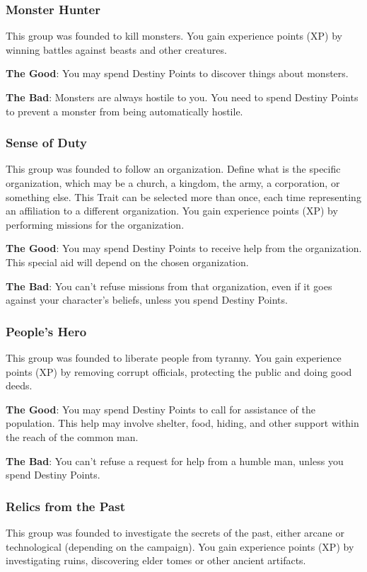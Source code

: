 \subsubsection{Monster Hunter}
This group was founded to kill monsters.
You gain experience points (XP) by winning battles
against beasts and other creatures.

\textbf{The Good}: You may spend Destiny Points
to discover things about monsters.

\textbf{The Bad}: Monsters are always hostile to
you. You need to spend Destiny Points to prevent a
monster from being automatically hostile.

\subsubsection{Sense of Duty}
This group was founded to follow an
organization. Define what is the specific
organization, which may be a church, a kingdom,
the army, a corporation, or something else. This
Trait can be selected more than once, each time
representing an affiliation to a different
organization. You gain experience points (XP) by
performing missions for the organization.

\textbf{The Good}: You may spend Destiny Points
to receive help from the organization. This special
aid will depend on the chosen organization.

\textbf{The Bad}: You can’t refuse missions from
that organization, even if it goes against your
character’s beliefs, unless you spend Destiny
Points.

\subsubsection{People’s Hero}
This group was founded to liberate people
from tyranny. You gain experience points (XP) by
removing corrupt officials, protecting the public
and doing good deeds.

\textbf{The Good}: You may spend Destiny Points
to call for assistance of the population. This help
may involve shelter, food, hiding, and other
support within the reach of the common man.

\textbf{The Bad}: You can’t refuse a request for
help from a humble man, unless you spend Destiny
Points.

\subsubsection{Relics from the Past}
This group was founded to investigate the
secrets of the past, either arcane or technological
(depending on the campaign). You gain experience
points (XP) by investigating ruins, discovering
elder tomes or other ancient artifacts.

